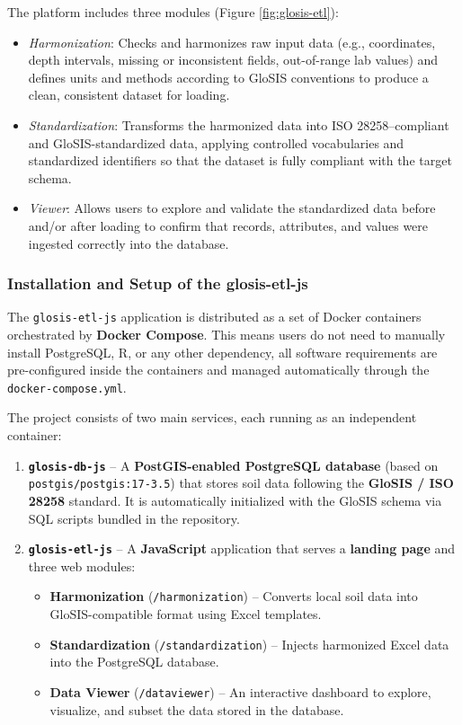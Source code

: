 \documentclass[
  10pt,
  b5paper,
  oneside]{book}
\providecommand{\tightlist}{%
  \setlength{\itemsep}{0pt}\setlength{\parskip}{0pt}}
\begin{document}
The platform includes three modules (Figure \ref{fig:glosis-etl}):

\begin{itemize}
\tightlist
\item
  \emph{Harmonization}: Checks and harmonizes raw input data (e.g., coordinates, depth intervals, missing or inconsistent fields, out-of-range lab values) and defines units and methods according to GloSIS conventions to produce a clean, consistent dataset for loading.
\item
  \emph{Standardization}: Transforms the harmonized data into ISO 28258--compliant and GloSIS-standardized data, applying controlled vocabularies and standardized identifiers so that the dataset is fully compliant with the target schema.
\item
  \emph{Viewer}: Allows users to explore and validate the standardized data before and/or after loading to confirm that records, attributes, and values were ingested correctly into the database.
\end{itemize}

\subsubsection{Installation and Setup of the glosis-etl-js}\label{installation-and-setup-of-the-glosis-etl-js}

The \texttt{glosis-etl-js} application is distributed as a set of Docker containers orchestrated by \textbf{Docker Compose}. This means users do not need to manually install PostgreSQL, R, or any other dependency, all software requirements are pre-configured inside the containers and managed automatically through the \texttt{docker-compose.yml}.

The project consists of two main services, each running as an independent container:

\begin{enumerate}
\def\labelenumi{\arabic{enumi}.}
\item
  \textbf{\texttt{glosis-db-js}} -- A \textbf{PostGIS-enabled PostgreSQL database} (based on \texttt{postgis/postgis:17-3.5}) that stores soil data following the \textbf{GloSIS / ISO 28258} standard. It is automatically initialized with the GloSIS schema via SQL scripts bundled in the repository.
\item
  \textbf{\texttt{glosis-etl-js}} -- A \textbf{JavaScript} application that serves a \textbf{landing page} and three web modules:

  \begin{itemize}
  \tightlist
  \item
    \textbf{Harmonization} (\texttt{/harmonization}) -- Converts local soil data into GloSIS-compatible format using Excel templates.
  \item
    \textbf{Standardization} (\texttt{/standardization}) -- Injects harmonized Excel data into the PostgreSQL database.
  \item
    \textbf{Data Viewer} (\texttt{/dataviewer}) -- An interactive dashboard to explore, visualize, and subset the data stored in the database.
  \end{itemize}
\end{enumerate}
\end{document}
